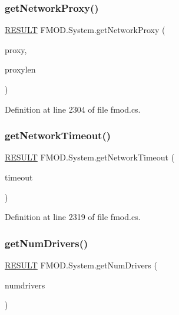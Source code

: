 \subsubsection{\texorpdfstring{get\+Network\+Proxy()}{getNetworkProxy()}}
{\footnotesize\ttfamily \hyperlink{namespace_f_m_o_d_a305d1176ef3f8c8815861a60407ac33d}{R\+E\+S\+U\+LT} F\+M\+O\+D.\+System.\+get\+Network\+Proxy (\begin{DoxyParamCaption}\item[{String\+Builder}]{proxy,  }\item[{int}]{proxylen }\end{DoxyParamCaption})}



Definition at line 2304 of file fmod.\+cs.

\mbox{\label{class_f_m_o_d_1_1_system_ae24ccdfa80732a0d74db768bc3ca8643}} 
\subsubsection{\texorpdfstring{get\+Network\+Timeout()}{getNetworkTimeout()}}
{\footnotesize\ttfamily \hyperlink{namespace_f_m_o_d_a305d1176ef3f8c8815861a60407ac33d}{R\+E\+S\+U\+LT} F\+M\+O\+D.\+System.\+get\+Network\+Timeout (\begin{DoxyParamCaption}\item[{out int}]{timeout }\end{DoxyParamCaption})}



Definition at line 2319 of file fmod.\+cs.

\mbox{\label{class_f_m_o_d_1_1_system_a93325ff7d2ffbd291208ea5a40ab8416}} 
\subsubsection{\texorpdfstring{get\+Num\+Drivers()}{getNumDrivers()}}
{\footnotesize\ttfamily \hyperlink{namespace_f_m_o_d_a305d1176ef3f8c8815861a60407ac33d}{R\+E\+S\+U\+LT} F\+M\+O\+D.\+System.\+get\+Num\+Drivers (\begin{DoxyParamCaption}\item[{out int}]{numdrivers }\end{DoxyParamCaption})}



